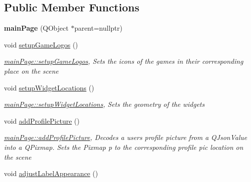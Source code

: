 \subsection*{Public Member Functions}
\begin{DoxyCompactItemize}
\item 
\mbox{\label{classmainPage_ad1718588c51fd343bc968bb7285b9788}} 
{\bfseries main\+Page} (Q\+Object $\ast$parent=nullptr)
\item 
\mbox{\label{classmainPage_a95ca7745b5b82100f95af516c9fa21e2}} 
void \hyperlink{classmainPage_a95ca7745b5b82100f95af516c9fa21e2}{setup\+Game\+Logos} ()
\begin{DoxyCompactList}\small\item\em \hyperlink{classmainPage_a95ca7745b5b82100f95af516c9fa21e2}{main\+Page\+::setup\+Game\+Logos}, Sets the icons of the games in their corresponding place on the scene \end{DoxyCompactList}\item 
\mbox{\label{classmainPage_a418bad8a789a1fdc183699ffd7758149}} 
void \hyperlink{classmainPage_a418bad8a789a1fdc183699ffd7758149}{setup\+Widget\+Locations} ()
\begin{DoxyCompactList}\small\item\em \hyperlink{classmainPage_a418bad8a789a1fdc183699ffd7758149}{main\+Page\+::setup\+Widget\+Locations}, Sets the geometry of the widgets \end{DoxyCompactList}\item 
\mbox{\label{classmainPage_a6568ab3ff55a0004a211e0d398d99e71}} 
void \hyperlink{classmainPage_a6568ab3ff55a0004a211e0d398d99e71}{add\+Profile\+Picture} ()
\begin{DoxyCompactList}\small\item\em \hyperlink{classmainPage_a6568ab3ff55a0004a211e0d398d99e71}{main\+Page\+::add\+Profile\+Picture}, Decodes a user\textquotesingle{}s profile picture from a Q\+Json\+Value into a Q\+Pixmap. Sets the Pixmap p to the corresponding profile pic location on the scene \end{DoxyCompactList}\item 
\mbox{\label{classmainPage_a5a1a5829cf997a8820ce25f3bc7826bf}} 
void \hyperlink{classmainPage_a5a1a5829cf997a8820ce25f3bc7826bf}{adjust\+Label\+Appearance} ()

\end{DoxyCompactItemize}
